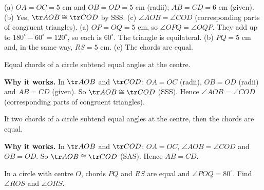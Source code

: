 \begin{answerblock}
 (a) $OA=OC=5$ cm and $OB=OD=5$ cm (radii); $AB=CD=6$ cm (given). (b) Yes, $\tr AOB\cong\tr COD$ by SSS. (c) $\angle AOB=\angle COD$ (corresponding parts of congruent triangles).
 (a) $OP=OQ=5$ cm, so $\angle OPQ=\angle OQP$. They add up to $180^\circ-60^\circ=120^\circ$, so each is $60^\circ$. The triangle is equilateral. (b) $PQ=5$ cm and, in the same way, $RS=5$ cm. (c) The chords are equal.
\end{answerblock}


\begin{theorem}
Equal chords of a circle subtend equal angles at the centre.
\end{theorem}


\textbf{Why it works.} In $\tr AOB$ and $\tr COD$:
$OA=OC$ (radii), $OB=OD$ (radii) and $AB=CD$ (given).
So $\tr AOB\cong\tr COD$ (SSS). Hence $\angle AOB=\angle COD$ (corresponding parts of congruent triangles).

\begin{theorem}[Converse]
If two chords of a circle subtend equal angles at the centre, then the chords are equal.
\end{theorem}

\textbf{Why it works.} In $\tr AOB$ and $\tr COD$: $OA=OC$, $\angle AOB=\angle COD$ and $OB=OD$. So $\tr AOB\cong\tr COD$ (SAS). Hence $AB=CD$.

\begin{example}
In a circle with centre $O$, chords $PQ$ and $RS$ are equal and $\angle POQ=80^\circ$. Find $\angle ROS$ and $\angle ORS$.
\end{example}


